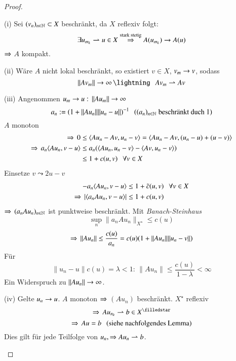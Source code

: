 \begin{proof}
    \begin{description}
    \item{(i)}
        Sei $(v_n)_{n\in \mathbb{N}}\subset X$ beschränkt, da $X$ reflexiv folgt:
        \[
            \exists u_{m_k} \rightharpoonup u \in X\overset{\text{stark stetig}}{\Rightarrow} A(u_{m_k})\rightarrow A(u)
        \]
        $\Rightarrow$ $A$ kompakt.
    \item{(ii)}
    Wäre $A$ nicht lokal beschränkt, so existiert $v\in X$, $v_m\rightarrow v$, sodass
    \[
        \|Av_m\|\ra \infty\, \lightning  \qq Av_m \rightharpoonup Av
    \]
    \item{(iii)}
    Angenommen $u_m\rightarrow u: \, \|Au_m\|\rightarrow \infty$
    \[
        a_n:=(1+\|Au_n\|\|u_n-u\|)^{-1} \hspace{.25cm} ((a_n)_{n\in \mathbb{N}} \text{ beschränkt duch $1$})
    \]
    $A$ monoton
    \begin{align*}
        \Rightarrow \, 0&\leq \langle Au_n-Av,u_n-v\rangle= \langle Au_n-Av,(u_n-u)+(u-v)\rangle\\
        \Rightarrow\, a_n\langle Au_n,v-u\rangle &\leq a_n(\langle Au_n,u_n-v\rangle-\langle Av,u_n-v\rangle)\\
        &\leq 1+ c( u,v) \hspace{.25cm} \forall v\in X
    \end{align*}
    Einsetze $v\leadsto 2u-v$
    \begin{align*}
        -a_n \langle Au_n,v-u\rangle&\leq 1+\tilde c( u,v) \hspace{.25cm} \forall v \in X\\
        \Rightarrow \, |\langle a_n A u_n,v-u\rangle|&\leq 1+c( u,v)
    \end{align*}
    $\Rightarrow \, (a_nAu_n)_{n\in \mathbb{N}}$ ist punktweise beschränkt. Mit \textit{Banach-Steinhaus}
    \[
        \sup_n\|a_nAu_n\|_{X^\star}\leq c(u)
    \]
    \[
        \Rightarrow \, \|Au_n\|\leq \frac{c(u)}{a_n} = c(u)(1+\|Au_n\|\|u_n-v\|)
    \]
    Für
    \[
        \|u_n-u\|c(u)=\lambda <1: \, \|Au_n\|\leq \frac{c(u)}{1-\lambda}<\infty
    \]
    Ein Widerspruch zu $\|Au_n\|\rightarrow \infty$.
    \item{(iv)}
    Gelte $u_n\rightarrow u$. $A$ monoton $\Rightarrow$ $(Au_n)$ beschränkt.
    $X^\star$ reflexiv
    \[
        \Ra \, Au_{n_k}\rightharpoonup b \in X^\star
    \]
    \[
        \Rightarrow \, Au=b \hspace{.25cm} \text{(siehe nachfolgendes Lemma)}
    \]
    Dies gilt für jede Teilfolge von $u_n, \Rightarrow  Au_n \rightharpoonup b$.
    \end{description}
    \[ \]
\end{proof}

